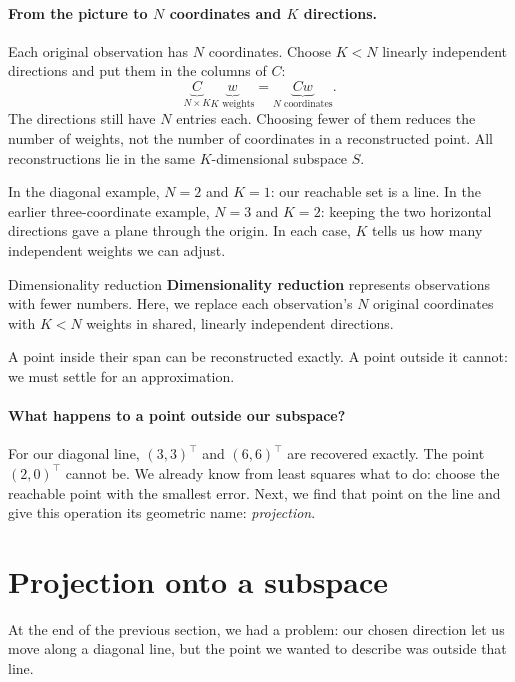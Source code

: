 \documentclass[a4paper,12pt,oneside]{report}
\begin{document}
\paragraph{From the picture to $N$ coordinates and $K$ directions.}
Each original observation has $N$ coordinates. Choose $K<N$
linearly independent directions and put them in the columns of $C$:
\[
  \underbrace{C}_{N\times K}
  \underbrace{w}_{K\text{ weights}}
  =\underbrace{Cw}_{N\text{ coordinates}}.
\]
The directions still have $N$ entries each. Choosing fewer of them
reduces the number of weights, not the number of coordinates in a
reconstructed point. All reconstructions lie in the same
$K$-dimensional subspace $S$.

In the diagonal example, $N=2$ and $K=1$: our reachable set is a line.
In the earlier three-coordinate example, $N=3$ and $K=2$: keeping
the two horizontal directions gave a plane through the origin.
In each case, $K$ tells us how many independent weights we can adjust.

\begin{frameddefn}{Dimensionality reduction}
\textbf{Dimensionality reduction} represents observations with fewer
numbers. Here, we replace each observation's $N$ original coordinates
with $K<N$ weights in shared, linearly independent directions.

A point inside their span can be reconstructed exactly. A point
outside it cannot: we must settle for an approximation.
\end{frameddefn}

\paragraph{What happens to a point outside our subspace?}
For our diagonal line, $(3,3)^\top$ and $(6,6)^\top$ are recovered
exactly. The point $(2,0)^\top$ cannot be. We already know from
least squares what to do: choose the reachable point with the
smallest error. Next, we find that point on the line and give this
operation its geometric name: \emph{projection}.

\clearpage
\section{Projection onto a subspace}

At the end of the previous section, we had a problem: our chosen
direction let us move along a diagonal line, but the point we wanted
to describe was outside that line.
\end{document}

